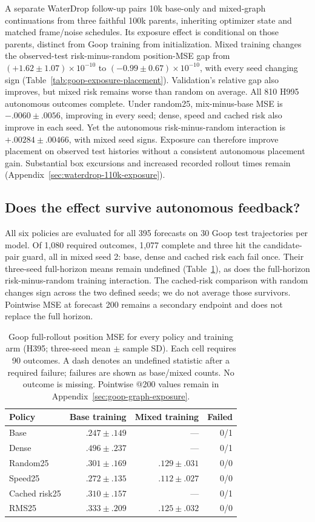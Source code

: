 A separate WaterDrop follow-up pairs 10k base-only and mixed-graph continuations from three faithful 100k parents, inheriting optimizer state and matched frame/noise schedules. Its exposure effect is conditional on those parents, distinct from Goop training from initialization. Mixed training changes the observed-test risk-minus-random position-MSE gap from $(+1.62\pm1.07)\times10^{-10}$ to $(-0.99\pm0.67)\times10^{-10}$, with every seed changing sign (Table~\ref{tab:goop-exposure-placement}). Validation's relative gap also improves, but mixed risk remains worse than random on average. All 810 H995 autonomous outcomes complete. Under random25, mix-minus-base MSE is $-.0060\pm.0056$, improving in every seed; dense, speed and cached risk also improve in each seed. Yet the autonomous risk-minus-random interaction is $+.00284\pm.00466$, with mixed seed signs. Exposure can therefore improve placement on observed test histories without a consistent autonomous placement gain. Substantial box excursions and increased recorded rollout times remain (Appendix~\ref{sec:waterdrop-110k-exposure}).

\subsection{Does the effect survive autonomous feedback?}
All six policies are evaluated for all 395 forecasts on 30 Goop test trajectories per model. Of 1,080 required outcomes, 1,077 complete and three hit the candidate-pair guard, all in mixed seed 2: base, dense and cached risk each fail once. Their three-seed full-horizon means remain undefined (Table~\ref{tab:goop-rollouts}), as does the full-horizon risk-minus-random training interaction. The cached-risk comparison with random changes sign across the two defined seeds; we do not average those survivors. Pointwise MSE at forecast 200 remains a secondary endpoint and does not replace the full horizon.

\begin{table}[t]
\centering\scriptsize
\caption{Goop full-rollout position MSE for every policy and training arm (H395; three-seed mean $\pm$ sample SD). Each cell requires 90 outcomes. A dash denotes an undefined statistic after a required failure; failures are shown as base/mixed counts. No outcome is missing. Pointwise @200 values remain in Appendix~\ref{sec:goop-graph-exposure}.}
\label{tab:goop-rollouts}
\setlength{\tabcolsep}{3pt}
\begin{tabular}{lrrr}
\toprule
Policy & Base training & Mixed training & Failed\\
\midrule
Base & $.247\pm.149$ & --- & 0/1\\
Dense & $.496\pm.237$ & --- & 0/1\\
Random25 & $.301\pm.169$ & $.129\pm.031$ & 0/0\\
Speed25 & $.272\pm.135$ & $.112\pm.027$ & 0/0\\
Cached risk25 & $.310\pm.157$ & --- & 0/1\\
RMS25 & $.333\pm.209$ & $.125\pm.032$ & 0/0\\
\bottomrule
\end{tabular}
\end{table}

